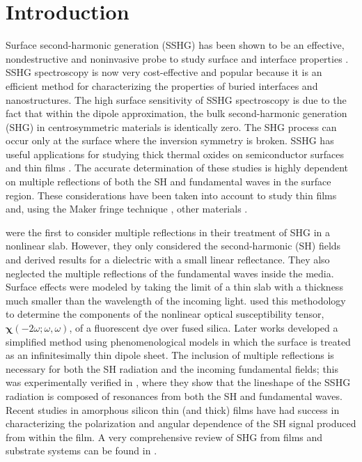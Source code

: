 \documentclass[utf8]{frontiersSCNS}
\begin{document}
\section{Introduction}\label{sec:intro}

Surface second-harmonic generation (SSHG) has been shown to be an effective,
nondestructive and noninvasive probe to study surface and interface properties
\citep{chenPRL81, shenNAT89, mcgilpOE94, bloembergenAPB99, mcgilpSRL99,
lupkeSSR99, downerPSSA01, downerSIA01}. SSHG spectroscopy is now very
cost-effective and popular because it is an efficient method for characterizing
the properties of buried interfaces and nanostructures. The high surface
sensitivity of SSHG spectroscopy is due to the fact that within the dipole
approximation, the bulk second-harmonic generation (SHG) in centrosymmetric
materials is identically zero. The SHG process can occur only at the surface
where the inversion symmetry is broken. SSHG has useful applications for
studying thick thermal oxides on semiconductor surfaces
\citep{vanhasseltJOSAB95, kolthammerPRB05} and thin films \citep{yeganehPRB92}.
The accurate determination of these studies is highly dependent on multiple
reflections of both the SH and fundamental waves in the surface region. These
considerations have been taken into account to study thin films
\citep{haseAPL92, buinitskayaMJPS02, buinitskayaCAS03} and, using the Maker
fringe technique \citep{makerPRL62}, other materials \citep{tellierOC07,
abeJOSAB08}.

\cite{bloembergenPR62} were the first to consider multiple reflections in their
treatment of SHG in a nonlinear slab. However, they only considered the
second-harmonic (SH) fields and derived results for a dielectric with a small
linear reflectance. They also neglected the multiple reflections of the
fundamental waves inside the media. Surface effects were modeled by taking the
limit of a thin slab with a thickness much smaller than the wavelength of the
incoming light. \cite{dickAPB85} used this methodology to determine the
components of the nonlinear optical susceptibility tensor,
$\boldsymbol{\chi}(-2\omega;\omega,\omega)$, of a fluorescent dye over fused
silica. Later works \citep{sipePRB87, mizrahiJOSA88} developed a simplified
method using phenomenological models in which the surface is treated as an
infinitesimally thin dipole sheet. The inclusion of multiple reflections is
necessary for both the SH radiation and the incoming fundamental fields; this
was experimentally verified in \cite{moritaJJAP88}, where they show that the
lineshape of the SSHG radiation is composed of resonances from both the SH and
fundamental waves. Recent studies in amorphous silicon thin (and thick) films
\citep{kesselsAPL04, aartsPRB06, lettieriAPL07} have had success in
characterizing the polarization and angular dependence of the SH signal produced
from within the film. A very comprehensive review of SHG from films and
substrate systems can be found in
\cite{gielisJVSTA08}.
\end{document}
